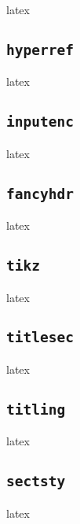 \documentclass{article}
\begin{document}
\begin{imtaCode}{latex}
\RequirePackage[T1]{fontenc}
\end{imtaCode}

\subsection{\texttt{hyperref}}
\begin{imtaCode}{latex}
\RequirePackage[hidelinks]{hyperref}
\end{imtaCode}

\subsection{\texttt{inputenc}}
\begin{imtaCode}{latex}
\RequirePackage[utf8]{inputenc}
\end{imtaCode}

\subsection{\texttt{fancyhdr}}
\begin{imtaCode}{latex}
\RequirePackage{fancyhdr}
\end{imtaCode}

\subsection{\texttt{tikz}}
\begin{imtaCode}{latex}
\RequirePackage{tikz}
\end{imtaCode}

\subsection{\texttt{titlesec}}
\begin{imtaCode}{latex}
\RequirePackage{titlesec}
\end{imtaCode}

\subsection{\texttt{titling}}
\begin{imtaCode}{latex}
\RequirePackage{titling}
\end{imtaCode}

\subsection{\texttt{sectsty}}
\begin{imtaCode}{latex}
\RequirePackage{sectsty}
\end{imtaCode}
\end{document}
